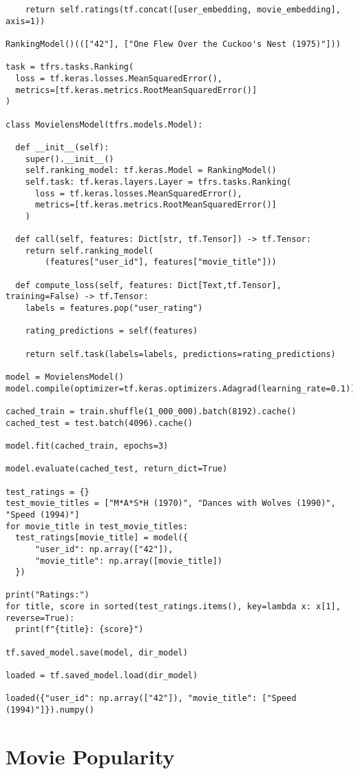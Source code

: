 \begin{verbatim}
    return self.ratings(tf.concat([user_embedding, movie_embedding], axis=1))

RankingModel()((["42"], ["One Flew Over the Cuckoo's Nest (1975)"]))

task = tfrs.tasks.Ranking(
  loss = tf.keras.losses.MeanSquaredError(),
  metrics=[tf.keras.metrics.RootMeanSquaredError()]
)

class MovielensModel(tfrs.models.Model):

  def __init__(self):
    super().__init__()
    self.ranking_model: tf.keras.Model = RankingModel()
    self.task: tf.keras.layers.Layer = tfrs.tasks.Ranking(
      loss = tf.keras.losses.MeanSquaredError(),
      metrics=[tf.keras.metrics.RootMeanSquaredError()]
    )

  def call(self, features: Dict[str, tf.Tensor]) -> tf.Tensor:
    return self.ranking_model(
        (features["user_id"], features["movie_title"]))

  def compute_loss(self, features: Dict[Text,tf.Tensor], training=False) -> tf.Tensor:
    labels = features.pop("user_rating")

    rating_predictions = self(features)

    return self.task(labels=labels, predictions=rating_predictions)

model = MovielensModel()
model.compile(optimizer=tf.keras.optimizers.Adagrad(learning_rate=0.1))

cached_train = train.shuffle(1_000_000).batch(8192).cache()
cached_test = test.batch(4096).cache()

model.fit(cached_train, epochs=3)

model.evaluate(cached_test, return_dict=True)

test_ratings = {}
test_movie_titles = ["M*A*S*H (1970)", "Dances with Wolves (1990)", "Speed (1994)"]
for movie_title in test_movie_titles:
  test_ratings[movie_title] = model({
      "user_id": np.array(["42"]),
      "movie_title": np.array([movie_title])
  })

print("Ratings:")
for title, score in sorted(test_ratings.items(), key=lambda x: x[1], reverse=True):
  print(f"{title}: {score}")

tf.saved_model.save(model, dir_model)

loaded = tf.saved_model.load(dir_model)

loaded({"user_id": np.array(["42"]), "movie_title": ["Speed (1994)"]}).numpy()
\end{verbatim}

\chapter{Movie Popularity}
\label{apx:pop}

